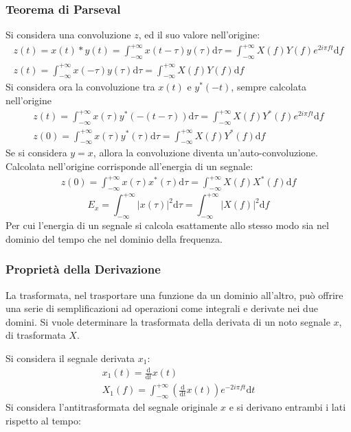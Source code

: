 \documentclass{article}
\newcommand{\df}{\mathrm{d}}
\numberwithin{equation}{subsection}
\begin{document}
\subsubsection{Teorema di Parseval}

Si considera una convoluzione $z$, ed il suo valore nell'origine:
\begin{gather*}
    z(t)=x(t)*y(t)=\displaystyle\int_{-\infty}^{+\infty}x(t-\tau)y(\tau)\df\tau=\int_{-\infty}^{+\infty}X(f)Y(f)e^{2i\pi ft}\df f\\
    z(t)=\displaystyle\int_{-\infty}^{+\infty}x(-\tau)y(\tau)\df\tau=\int_{-\infty}^{+\infty}X(f)Y(f)\df f 
\end{gather*}
Si considera ora la convoluzione tra $x(t)$ e $y^*(-t)$, sempre calcolata nell'origine
\begin{gather*}
    z(t)=\displaystyle\int_{-\infty}^{+\infty}x(\tau)y^*(-(t-\tau))\df\tau=\int_{-\infty}^{+\infty}X(f)Y^*(f)e^{2i\pi ft}\df f\\
    z(0)=\displaystyle\int_{-\infty}^{+\infty}x(\tau)y^*(\tau)\df\tau=\int_{-\infty}^{+\infty}X(f)Y^*(f)\df f
\end{gather*}
Se si considera $y=x$, allora la convoluzione diventa un'auto-convoluzione. Calcolata nell'origine corrisponde all'energia di un segnale:
\begin{gather*}
    z(0)=\displaystyle\int_{-\infty}^{+\infty}x(\tau)x^*(\tau)\df\tau=\int_{-\infty}^{+\infty}X(f)X^*(f)\df f
\end{gather*}
\begin{equation}
    E_x=\displaystyle\int_{-\infty}^{+\infty}|x(\tau)|^2\df\tau=\int_{-\infty}^{+\infty}|X(f)|^2\df f
\end{equation}
Per cui l'energia di un segnale si calcola esattamente allo stesso modo sia nel dominio del tempo che nel dominio della frequenza. 

\subsubsection{Proprietà della Derivazione}

La trasformata, nel trasportare una funzione da un dominio all'altro, può offrire una serie di semplificazioni ad operazioni come integrali e derivate nei due domini. Si vuole 
determinare la trasformata della derivata di un noto segnale $x$, di trasformata $X$. 

Si considera il segnale derivata $x_1$:
\begin{gather*}
    x_1(t)=\displaystyle\frac{\df}{\df t}x(t)\\
    X_1(f)=\displaystyle\int_{-\infty}^{+\infty}\left(\frac{\df}{\df t}x(t)\right)e^{-2i\pi ft}\df t
\end{gather*}
Si considera l'antitrasformata del segnale originale $x$ e si derivano entrambi i lati rispetto al tempo: 
\end{document}
